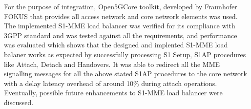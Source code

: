 \noindent
For the purpose of integration, Open5GCore toolkit, developed by Fraunhofer FOKUS that provides all access network and core network elements was used. The implemented S1-MME load balancer was verified for its compliance with 3GPP standard and was tested against all the requirements, and performance was evaluated which shows that the designed and implented S1-MME load balaner works as expected by successfully processing S1 Setup, S1AP procedures like Attach, Detach and Handovers. It was able to redirect all the MME signalling messages for all the above stated S1AP procedures to the core network with a delay latency overhead of around 10\% during attach operations. Eventually, possible future enhancements to S1-MME load balancer were discussed.









